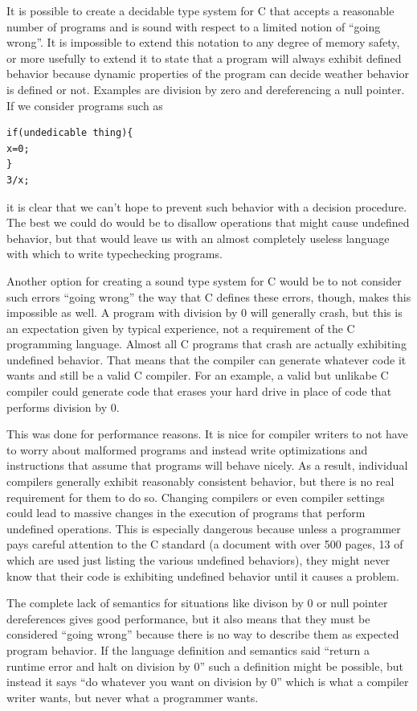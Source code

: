 \documentclass{puthesis}
\begin{document}
It is possible to create a decidable type system for C that accepts a reasonable
number of programs and is sound with respect to
a limited notion of ``going wrong''. It is impossible to extend this
notation to any degree of memory safety, or more usefully to extend it
to state that a program will always exhibit defined behavior because
dynamic properties of the program can decide weather behavior is
defined or not. Examples are division by zero and dereferencing a null
pointer. If we consider programs such as

\begin{verbatim}
if(undedicable thing){
x=0;
}
3/x;
\end{verbatim}

it is clear that we can't hope to prevent such behavior with a
decision procedure. The best we could do would be to
disallow operations that might cause undefined behavior, but that
would leave us with an almost completely useless language with which
to write typechecking programs. 

Another option for creating a sound
type system for C would be to not consider such errors ``going wrong''
the way that C defines these errors, though, makes this impossible as
well. A program with division by 0 will generally crash, but this is
an expectation given by typical experience, not a requirement of the C
programming language. Almost all C
programs that crash are actually exhibiting undefined behavior. That means that
the compiler can generate whatever code it wants and still be a valid
C compiler. For an example, a valid but unlikabe C compiler could
generate code that erases your hard drive in place of code that
performs division by 0.

This was done for performance reasons. It is nice for compiler writers
to not have to worry about malformed programs and instead write
optimizations and instructions that assume that programs will behave
nicely.  As a result, individual compilers generally exhibit
reasonably consistent behavior, but there is no real requirement for
them to do so. Changing compilers or even compiler settings could lead
to massive changes in the execution of programs that perform undefined
operations. This is especially dangerous because unless a programmer
pays careful attention to the C standard (a document with over 500
pages, 13 of which are used just listing the various undefined
behaviors), they might never know that their code is exhibiting
undefined behavior until it causes a problem.

The complete lack of semantics for situations like divison by 0 or
null pointer dereferences gives good performance, but it also means
that they must be considered ``going wrong'' because there is no way
to describe them as expected program behavior. If the language
definition and semantics said ``return a runtime error and halt on
division by 0'' such a definition might be possible, but instead it
says ``do whatever you want on division by 0'' which is what a
compiler writer wants, but never what a programmer wants. 
\end{document}
